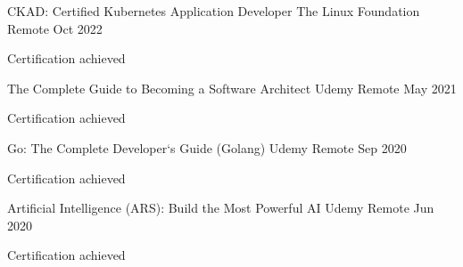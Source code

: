 

\begin{cventries}

  \cventry
    {CKAD: Certified Kubernetes Application Developer} %
    {The Linux Foundation} %
    {Remote} %
    {Oct 2022} %
    {
      \begin{cvitems} %
        \item {Certification achieved}
      \end{cvitems}
    }

  \cventry
    {The Complete Guide to Becoming a Software Architect} %
    {Udemy} %
    {Remote} %
    {May 2021} %
    {
      \begin{cvitems} %
        \item {Certification achieved}
      \end{cvitems}
    }
  \cventry
    {Go: The Complete Developer`s Guide (Golang)} %
    {Udemy} %
    {Remote} %
    {Sep 2020} %
    {
      \begin{cvitems} %
        \item {Certification achieved}
      \end{cvitems}
    }
  \cventry
    {Artificial Intelligence (ARS): Build the Most Powerful AI} %
    {Udemy} %
    {Remote} %
    {Jun 2020} %
    {
      \begin{cvitems} %
        \item {Certification achieved}
      \end{cvitems}
    }
\end{cventries}
